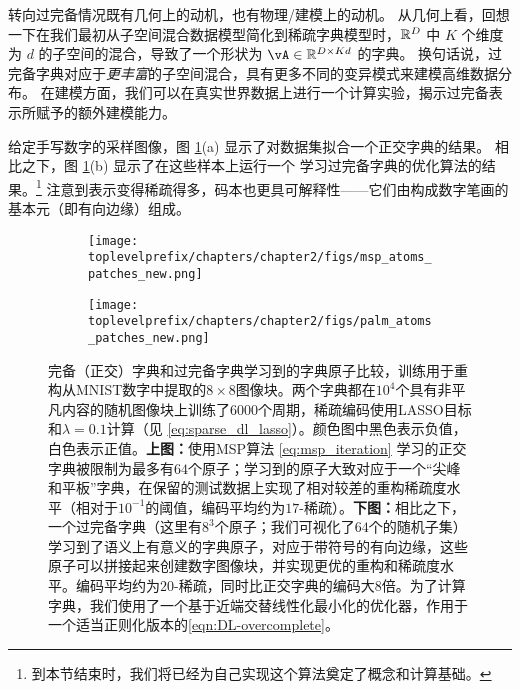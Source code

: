 \documentclass[../../book-main.tex]{subfiles}
\begin{document}
转向过完备情况既有几何上的动机，也有物理/建模上的动机。
从几何上看，回想一下在我们最初从子空间混合数据模型简化到稀疏字典模型时，$\mathbb{R}^D$ 中 $K$ 个维度为 $d$ 的子空间的混合，导致了一个形状为 $\vA \in \R^{D \times Kd}$ 的字典。
换句话说，过完备字典对应于\textit{更丰富}的子空间混合，具有更多不同的变异模式来建模高维数据分布。
在建模方面，我们可以在真实世界数据上进行一个计算实验，揭示过完备表示所赋予的额外建模能力。
\begin{example}
给定手写数字的采样图像，图 \ref{fig:ReconMNIST}(a) 显示了对数据集拟合一个正交字典的结果。
相比之下，图 \ref{fig:ReconMNIST}(b) 显示了在这些样本上运行一个
学习过完备字典的优化算法的结果。\footnote{到本节结束时，我们将已经为自己实现这个算法奠定了概念和计算基础。}
注意到表示变得稀疏得多，码本也更具可解释性——它们由构成数字笔画的基本元（即有向边缘）组成。
\end{example}

\begin{figure}[t]
\centering
    \begin{subfigure}{0.9\linewidth}
        \centering
        \texttt{[image: \\toplevelprefix/chapters/chapter2/figs/msp\_atoms\_patches\_new.png]}
        \caption{}
    \end{subfigure}
    \begin{subfigure}{0.9\linewidth}
        \centering
        \texttt{[image: \\toplevelprefix/chapters/chapter2/figs/palm\_atoms\_patches\_new.png]}
        \caption{}
    \end{subfigure}
    \caption{完备（正交）字典和过完备字典学习到的字典原子比较，训练用于重构从MNIST数字中提取的$8 \times 8$图像块。两个字典都在$10^4$个具有非平凡内容的随机图像块上训练了$6000$个周期，稀疏编码使用LASSO目标和$\lambda=0.1$计算（见 \eqref{eq:sparse_dl_lasso}）。颜色图中黑色表示负值，白色表示正值。\textbf{上图：}使用MSP算法 \eqref{eq:msp_iteration} 学习的正交字典被限制为最多有$64$个原子；学习到的原子大致对应于一个“尖峰和平板”字典，在保留的测试数据上实现了相对较差的重构稀疏度水平（相对于$10^{-1}$的阈值，编码平均约为$17$-稀疏）。\textbf{下图：}相比之下，一个过完备字典（这里有$8^3$个原子；我们可视化了$64$个的随机子集）学习到了语义上有意义的字典原子，对应于带符号的有向边缘，这些原子可以拼接起来创建数字图像块，并实现更优的重构和稀疏度水平。编码平均约为$20$-稀疏，同时比正交字典的编码大$8$倍。为了计算字典，我们使用了一个基于近端交替线性化最小化的优化器，作用于一个适当正则化版本的\eqref{eqn:DL-overcomplete}。}
    \label{fig:ReconMNIST}
\end{figure}
\end{document}
